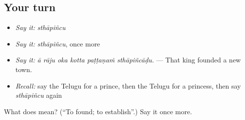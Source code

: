 \subsection*{Your turn}
\begin{itemize}
\raggedright
  \item \emph{Say it:} \emph{sthāpiñcu}
  \item \emph{Say it:} \emph{sthāpiñcu}, once more
  \item \emph{Say it:} \emph{ā rāju oka kotta paṭṭaṇaṁ sthāpiñcāḍu.} — That king founded a new town.
  \item \emph{Recall:} say the Telugu for a prince, then the Telugu for a princess, then say \emph{sthāpiñcu} again
\end{itemize}

\begin{tcolorbox}[breakable,colback=teal!4,colframe=teal!35!black,title={Before you move on}]
What does  mean? (\textquotedblleft{}To found; to establish\textquotedblright{}.) Say it once more.
\end{tcolorbox}
